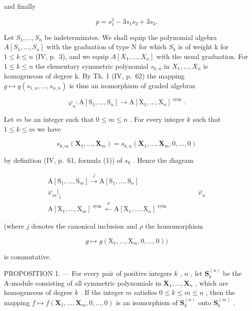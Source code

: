 and finally

\[
p = s _ {1} ^ {3} - 3 s _ {1} s _ {2} + 3 s _ {3}.
\]

Let \(S_1, \ldots, S_n\) be indeterminates. We shall equip the polynomial algebra \(A[S_1, \ldots, S_n]\) with the graduation of type N for which \(S_k\) is of weight k for \(1 \leqslant k \leqslant n\) (IV, p.~3), and we equip \(A[X_1, \ldots, X_n]\) with the usual graduation. For \(1 \leqslant k \leqslant n\) the elementary symmetric polynomial \(s_{k,n}\) in \(X_1, \ldots, X_n\) is homogeneous of degree k. By Th. 1 (IV, p.~62) the mapping \(g \mapsto g(s_{1,n}, \ldots, s_{n,n})\) is thus an isomorphism of graded algebras

\[
\varphi_ {n}: \mathrm{A} [ \mathrm{S} _ {1}, \dots , \mathrm{S} _ {n} ] \rightarrow \mathrm{A} [ \mathrm{X} _ {1}, \dots , \mathrm{X} _ {n} ] ^ {\text { sym }}.
\]

Let \(m\) be an integer such that \(0 \leqslant m \leqslant n\) . For every integer \(k\) such that \(1 \leqslant k \leqslant m\) we have

\[
s _ {k, m} (\mathbf {X} _ {1}, \dots , \mathbf {X} _ {m}) = s _ {k, n} (\mathbf {X} _ {1}, \dots , \mathbf {X} _ {m}, 0, \dots , 0)\tag{9}
\]

by definition (IV, p.~61, formula (1)) of \(s_k\) . Hence the diagram

\[
\begin{array}{c} \mathrm{A} [ \mathrm{S} _ {1}, \dots , \mathrm{S} _ {m} ] \xrightarrow {j} \mathrm{A} [ \mathrm{S} _ {1}, \dots , \mathrm{S} _ {n} ] \\ \varphi_ {m} \Bigg | _ {\downarrow} \qquad \qquad \qquad \qquad \qquad \qquad \qquad \qquad \qquad \qquad \varphi_ {n} \\ \mathrm{A} [ \mathrm{X} _ {1}, \dots , \mathrm{X} _ {m} ] ^ {\text { sym }} \xleftarrow {\rho} \mathrm{A} [ \mathrm{X} _ {1}, \dots , \mathrm{X} _ {n} ] ^ {\text { sym }} \end{array}\tag{10}
\]

(where \(j\) denotes the canonical inclusion and \(\rho\) the homomorphism

\[
g \mapsto g \left(\mathrm{X} _ {1}, \dots , \mathrm{X} _ {m}, 0, \dots , 0\right))
\]

is commutative.

PROPOSITION 1. --- For every pair of positive integers \(k\) , \(n\) , let \(\mathbf{S}_{k}^{(n)}\) be the A-module consisting of all symmetric polynomials in \(\mathbf{X}_{1},\ldots,\mathbf{X}_{n}\) , which are homogeneous of degree \(k\) . If the integer \(m\) satisfies \(0\leqslant k\leqslant m\leqslant n\) , then the mapping \(f\mapsto f(\mathbf{X}_{1},\ldots,\mathbf{X}_{m},0,\ldots,0)\) is an isomorphism of \(\mathbf{S}_{k}^{(n)}\) onto \(\mathbf{S}_{k}^{(m)}\) .

